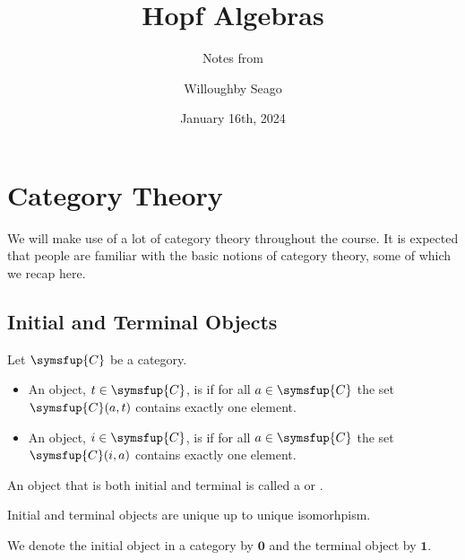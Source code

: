 \documentclass[fleqn]{NotesClass}
\title{Hopf Algebras}
\author{Willoughby Seago}
\date{January 16th, 2024}
\subtitle{Notes from}
\newcommand{\cat}[1]{\symsfup{#1}}
\newcommand{\initial}{\symbf{0}}
\newcommand{\terminal}{\symbf{1}}
\begin{document}
    \frontmatter
    \titlepage
    \innertitlepage{}
    \tableofcontents
    \mainmatter
    \chapter{Category Theory}
    We will make use of a lot of category theory throughout the course.
    It is expected that people are familiar with the basic notions of category theory, some of which we recap here.
    
    \section{Initial and Terminal Objects}
    \begin{dfn}{}{}
        Let \(\cat{C}\) be a category.
        \begin{itemize}
            \item An object, \(t \in \cat{C}\), is  if for all \(a \in \cat{C}\) the set \(\cat{C}(a, t)\) contains exactly one element.
            \item An object, \(i \in \cat{C}\), is  if for all \(a \in \cat{C}\) the set \(\cat{C}(i, a)\) contains exactly one element.
        \end{itemize}
        An object that is both initial and terminal is called a  or .
    \end{dfn}
    
    \begin{lma}{}{}
        Initial and terminal objects are unique up to unique isomorhpism.
    \end{lma}
    
    \begin{ntn}{}{}
        We denote the initial object in a category by \(\initial\) and the terminal object by \(\terminal\).
    \end{ntn}
    
\end{document}
